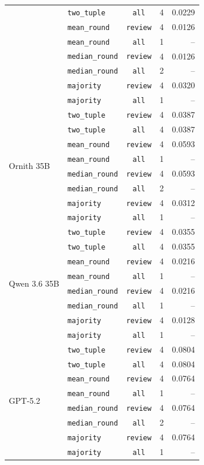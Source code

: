 \begin{table}[htbp]
{\begin{tabular}{llccr}
   & \texttt{two\_tuple} & \texttt{all} & 4 & 0.0229 \\
   & \texttt{mean\_round} & \texttt{review} & 4 & 0.0126 \\
   & \texttt{mean\_round} & \texttt{all} & 1 & -- \\
   & \texttt{median\_round} & \texttt{review} & 4 & 0.0126 \\
   & \texttt{median\_round} & \texttt{all} & 2 & -- \\
   & \texttt{majority} & \texttt{review} & 4 & 0.0320 \\
   & \texttt{majority} & \texttt{all} & 1 & -- \\
\midrule
  \multirow{8}{*}{Ornith 35B} & \texttt{two\_tuple} & \texttt{review} & 4 & 0.0387 \\
   & \texttt{two\_tuple} & \texttt{all} & 4 & 0.0387 \\
   & \texttt{mean\_round} & \texttt{review} & 4 & 0.0593 \\
   & \texttt{mean\_round} & \texttt{all} & 1 & -- \\
   & \texttt{median\_round} & \texttt{review} & 4 & 0.0593 \\
   & \texttt{median\_round} & \texttt{all} & 2 & -- \\
   & \texttt{majority} & \texttt{review} & 4 & 0.0312 \\
   & \texttt{majority} & \texttt{all} & 1 & -- \\
\midrule
  \multirow{8}{*}{Qwen 3.6 35B} & \texttt{two\_tuple} & \texttt{review} & 4 & 0.0355 \\
   & \texttt{two\_tuple} & \texttt{all} & 4 & 0.0355 \\
   & \texttt{mean\_round} & \texttt{review} & 4 & 0.0216 \\
   & \texttt{mean\_round} & \texttt{all} & 1 & -- \\
   & \texttt{median\_round} & \texttt{review} & 4 & 0.0216 \\
   & \texttt{median\_round} & \texttt{all} & 1 & -- \\
   & \texttt{majority} & \texttt{review} & 4 & 0.0128 \\
   & \texttt{majority} & \texttt{all} & 1 & -- \\
\midrule
  \multirow{8}{*}{GPT-5.2} & \texttt{two\_tuple} & \texttt{review} & 4 & 0.0804 \\
   & \texttt{two\_tuple} & \texttt{all} & 4 & 0.0804 \\
   & \texttt{mean\_round} & \texttt{review} & 4 & 0.0764 \\
   & \texttt{mean\_round} & \texttt{all} & 1 & -- \\
   & \texttt{median\_round} & \texttt{review} & 4 & 0.0764 \\
   & \texttt{median\_round} & \texttt{all} & 2 & -- \\
   & \texttt{majority} & \texttt{review} & 4 & 0.0764 \\
   & \texttt{majority} & \texttt{all} & 1 & -- \\
\bottomrule
\end{tabular}%
}
\end{table}
